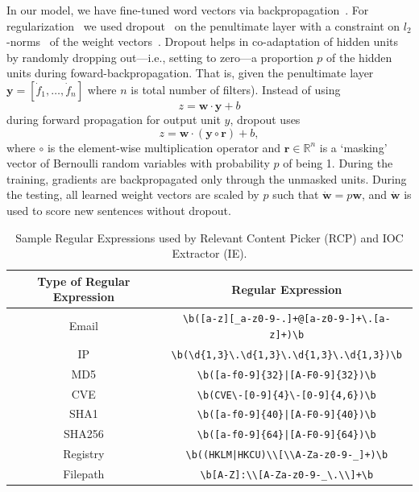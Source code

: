In our model, we have fine-tuned word vectors via backpropagation~\cite{rumelhart}. For regularization~\cite{zou} we used dropout~\cite{srivastava} on the penultimate layer with a constraint on $l_2$-norms~\cite{ng} of the weight vectors~\cite{hinton}. Dropout helps in co-adaptation of hidden units by randomly dropping out---i.e., setting to zero---a proportion $p$ of the hidden units during foward-backpropagation. That is, given the penultimate layer $\mathbf{y} = [\dot{f}_1, \ldots, \dot{f}_n]$ where $n$ is total number of filters). Instead of using
\begin{equation}
z = \mathbf{w} \cdot \mathbf{y} + b
\end{equation}
during forward propagation for output unit $y$, dropout uses
\begin{equation}
z = \mathbf{w} \cdot (\mathbf{y}\circ\mathbf{r}) + b,
\end{equation}
where $\circ$ is the element-wise multiplication operator and $\mathbf{r} \in \mathbb{R}^n$ is a `masking' vector of Bernoulli random variables with probability $p$ of being 1. During the training, gradients\cite{friedman} are backpropagated only through the unmasked units. During the testing, all learned weight vectors are scaled by $p$ such that $\dot{\mathbf{w}} = p\mathbf{w}$, and $\dot{\mathbf{w}}$ is used  to score new sentences without dropout.

\begin{table}[!tb]
	\centering
	\begin{tabular}{|c|c|}
		\hline
		\multicolumn{1}{|c|}{\textbf{Type of Regular Expression}} & \multicolumn{1}{c|}{\textbf{Regular Expression}}\\
		\hline
		Email & \verb/\b([a-z][_a-z0-9-.]+@[a-z0-9-]+\.[a-z]+)\b/ \\
		\hline    
		IP & \verb/\b(\d{1,3}\.\d{1,3}\.\d{1,3}\.\d{1,3})\b/ \\
		\hline
		MD5  & \verb/\b([a-f0-9]{32}|[A-F0-9]{32})\b/ \\
		\hline
		CVE  & \verb/\b(CVE\-[0-9]{4}\-[0-9]{4,6})\b/ \\
		\hline
		SHA1  & \verb/\b([a-f0-9]{40}|[A-F0-9]{40})\b/ \\
		\hline
		SHA256  & \verb/\b([a-f0-9]{64}|[A-F0-9]{64})\b/ \\
		\hline
		Registry  & \verb/\b((HKLM|HKCU)\\[\\A-Za-z0-9-_]+)\b/ \\
		\hline
		Filepath  & \verb/\b[A-Z]:\\[A-Za-z0-9-_\.\\]+\b/ \\
		\hline
	\end{tabular}
	\caption[]{Sample Regular Expressions used by Relevant Content Picker (RCP) and IOC Extractor (IE).}
	\label{table:reg}
\end{table}



